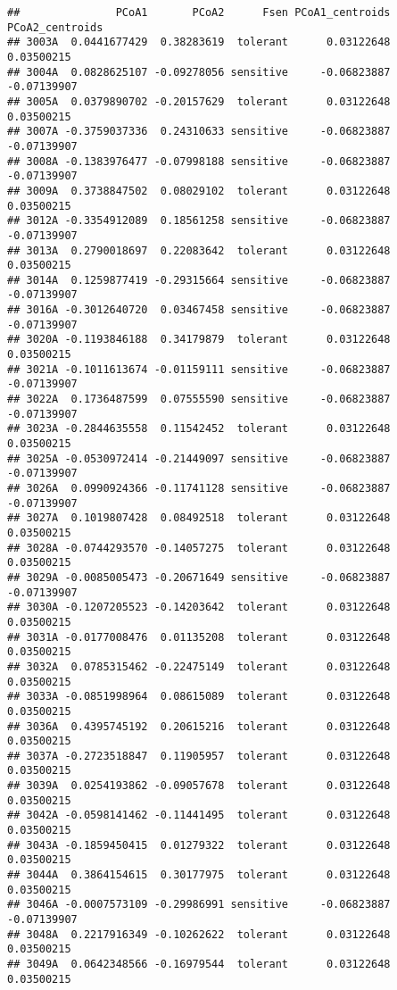\documentclass[
]{article}
\begin{document}
\begin{verbatim}
##               PCoA1       PCoA2      Fsen PCoA1_centroids PCoA2_centroids
## 3003A  0.0441677429  0.38283619  tolerant      0.03122648      0.03500215
## 3004A  0.0828625107 -0.09278056 sensitive     -0.06823887     -0.07139907
## 3005A  0.0379890702 -0.20157629  tolerant      0.03122648      0.03500215
## 3007A -0.3759037336  0.24310633 sensitive     -0.06823887     -0.07139907
## 3008A -0.1383976477 -0.07998188 sensitive     -0.06823887     -0.07139907
## 3009A  0.3738847502  0.08029102  tolerant      0.03122648      0.03500215
## 3012A -0.3354912089  0.18561258 sensitive     -0.06823887     -0.07139907
## 3013A  0.2790018697  0.22083642  tolerant      0.03122648      0.03500215
## 3014A  0.1259877419 -0.29315664 sensitive     -0.06823887     -0.07139907
## 3016A -0.3012640720  0.03467458 sensitive     -0.06823887     -0.07139907
## 3020A -0.1193846188  0.34179879  tolerant      0.03122648      0.03500215
## 3021A -0.1011613674 -0.01159111 sensitive     -0.06823887     -0.07139907
## 3022A  0.1736487599  0.07555590 sensitive     -0.06823887     -0.07139907
## 3023A -0.2844635558  0.11542452  tolerant      0.03122648      0.03500215
## 3025A -0.0530972414 -0.21449097 sensitive     -0.06823887     -0.07139907
## 3026A  0.0990924366 -0.11741128 sensitive     -0.06823887     -0.07139907
## 3027A  0.1019807428  0.08492518  tolerant      0.03122648      0.03500215
## 3028A -0.0744293570 -0.14057275  tolerant      0.03122648      0.03500215
## 3029A -0.0085005473 -0.20671649 sensitive     -0.06823887     -0.07139907
## 3030A -0.1207205523 -0.14203642  tolerant      0.03122648      0.03500215
## 3031A -0.0177008476  0.01135208  tolerant      0.03122648      0.03500215
## 3032A  0.0785315462 -0.22475149  tolerant      0.03122648      0.03500215
## 3033A -0.0851998964  0.08615089  tolerant      0.03122648      0.03500215
## 3036A  0.4395745192  0.20615216  tolerant      0.03122648      0.03500215
## 3037A -0.2723518847  0.11905957  tolerant      0.03122648      0.03500215
## 3039A  0.0254193862 -0.09057678  tolerant      0.03122648      0.03500215
## 3042A -0.0598141462 -0.11441495  tolerant      0.03122648      0.03500215
## 3043A -0.1859450415  0.01279322  tolerant      0.03122648      0.03500215
## 3044A  0.3864154615  0.30177975  tolerant      0.03122648      0.03500215
## 3046A -0.0007573109 -0.29986991 sensitive     -0.06823887     -0.07139907
## 3048A  0.2217916349 -0.10262622  tolerant      0.03122648      0.03500215
## 3049A  0.0642348566 -0.16979544  tolerant      0.03122648      0.03500215
\end{verbatim}
\end{document}
